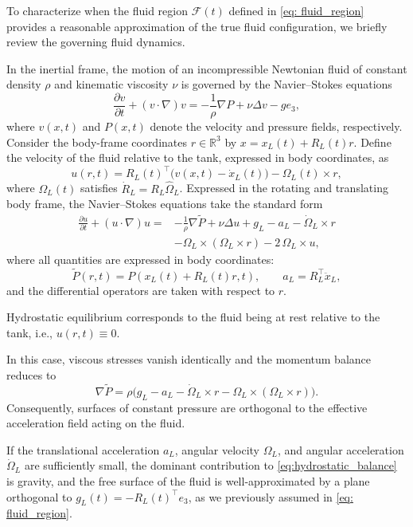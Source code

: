 \documentclass[letterpaper, 10 pt, conference]{ieeeconf}  %
\newcounter{part} %
\begin{document}
To characterize when the fluid region $\mathcal{F}(t)$ defined in \eqref{eq: fluid_region} provides a reasonable approximation of the true fluid configuration, we briefly review the governing fluid dynamics.

In the inertial frame, the motion of an incompressible Newtonian fluid of constant density $\rho$ and kinematic viscosity $\nu$ is governed by the Navier--Stokes equations
\begin{equation}
\label{eq:NS_inertial}
\frac{\partial v}{\partial t} + (v \cdot \nabla)v
=
-\frac{1}{\rho}\nabla P
+ \nu \Delta v
- ge_3,
\end{equation}
where $v(x,t)$ and $P(x,t)$ denote the velocity and pressure fields, respectively. Consider the body-frame coordinates $r \in \mathbb{R}^3$ by $x = x_L(t) + R_L(t) r$. Define the velocity of the fluid relative to the tank, expressed in body coordinates, as
\begin{equation}
\label{eq:relative_velocity}
u(r,t)
=
R_L(t)^\top\big(v(x,t) - \dot{x}_L(t)\big)
-
\Omega_L(t) \times r,
\end{equation}
where $\Omega_L(t)$ satisfies $\dot{R}_L = R_L \hat{\Omega}_L$. Expressed in the rotating and translating body frame, the Navier--Stokes equations take the standard form
\begin{align}
\label{eq:NS_body}
\frac{\partial u}{\partial t} + (u \cdot \nabla)u
=&
-\frac{1}{\rho}\nabla \tilde{P}
+ \nu \Delta u
+ g_L
- a_L
- \dot{\Omega}_L \times r \nonumber\\
& - \Omega_L \times (\Omega_L \times r)
- 2\,\Omega_L \times u,
\end{align}
where all quantities are expressed in body coordinates:
\[
\tilde{P}(r,t) = P(x_L(t) + R_L(t)r,t), \qquad
a_L = R_L^\top \ddot{x}_L,
\]
and the differential operators are taken with respect to $r$. 

Hydrostatic equilibrium corresponds to the fluid being at rest relative to the tank, i.e., $u(r,t) \equiv 0$.

In this case, viscous stresses vanish identically and the momentum balance reduces to
\begin{equation}
\label{eq:hydrostatic_balance}
\nabla \tilde{P}
=
\rho\Big(
g_L
- a_L
- \dot{\Omega}_L \times r
- \Omega_L \times (\Omega_L \times r)
\Big).
\end{equation}
Consequently, surfaces of constant pressure are orthogonal to the effective acceleration field acting on the fluid.

If the translational acceleration $a_L$, angular velocity $\Omega_L$, and angular acceleration $\dot{\Omega}_L$ are sufficiently small, the dominant contribution to \eqref{eq:hydrostatic_balance} is gravity, and the free surface of the fluid is well-approximated by a plane orthogonal to $g_L(t) = -R_L(t)^\top e_3$, as we previously assumed in \eqref{eq: fluid_region}.
\end{document}
